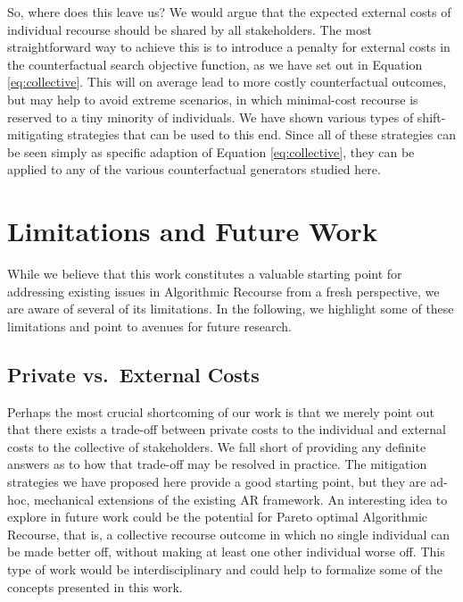 \documentclass[conference,final,]{IEEEtran}
\theoremstyle{definition}
\theoremstyle{definition}
\theoremstyle{definition}
\theoremstyle{definition}
\theoremstyle{remark}
\begin{document}
So, where does this leave us? We would argue that the expected external costs of individual recourse should be shared by all stakeholders. The most straightforward way to achieve this is to introduce a penalty for external costs in the counterfactual search objective function, as we have set out in Equation \eqref{eq:collective}. This will on average lead to more costly counterfactual outcomes, but may help to avoid extreme scenarios, in which minimal-cost recourse is reserved to a tiny minority of individuals. We have shown various types of shift-mitigating strategies that can be used to this end. Since all of these strategies can be seen simply as specific adaption of Equation \eqref{eq:collective}, they can be applied to any of the various counterfactual generators studied here.

\hypertarget{limit}{%
\section{Limitations and Future Work}\label{limit}}

While we believe that this work constitutes a valuable starting point for addressing existing issues in Algorithmic Recourse from a fresh perspective, we are aware of several of its limitations. In the following, we highlight some of these limitations and point to avenues for future research.

\hypertarget{private-vs.-external-costs}{%
\subsection{Private vs.~External Costs}\label{private-vs.-external-costs}}

Perhaps the most crucial shortcoming of our work is that we merely point out that there exists a trade-off between private costs to the individual and external costs to the collective of stakeholders. We fall short of providing any definite answers as to how that trade-off may be resolved in practice. The mitigation strategies we have proposed here provide a good starting point, but they are ad-hoc, mechanical extensions of the existing AR framework. An interesting idea to explore in future work could be the potential for Pareto optimal Algorithmic Recourse, that is, a collective recourse outcome in which no single individual can be made better off, without making at least one other individual worse off. This type of work would be interdisciplinary and could help to formalize some of the concepts presented in this work.
\end{document}
